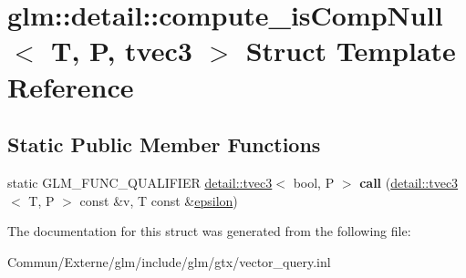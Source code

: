 \hypertarget{structglm_1_1detail_1_1compute__is_comp_null_3_01_t_00_01_p_00_01tvec3_01_4}{}\section{glm\+:\+:detail\+:\+:compute\+\_\+is\+Comp\+Null$<$ T, P, tvec3 $>$ Struct Template Reference}
\label{structglm_1_1detail_1_1compute__is_comp_null_3_01_t_00_01_p_00_01tvec3_01_4}
\subsection*{Static Public Member Functions}
\begin{DoxyCompactItemize}
\item 
static G\+L\+M\+\_\+\+F\+U\+N\+C\+\_\+\+Q\+U\+A\+L\+I\+F\+I\+ER \hyperlink{structglm_1_1detail_1_1tvec3}{detail\+::tvec3}$<$ bool, P $>$ {\bfseries call} (\hyperlink{structglm_1_1detail_1_1tvec3}{detail\+::tvec3}$<$ T, P $>$ const \&v, T const \&\hyperlink{group__gtc__constants_gacb41049b8d22c8aa90e362b96c524feb}{epsilon})\hypertarget{structglm_1_1detail_1_1compute__is_comp_null_3_01_t_00_01_p_00_01tvec3_01_4_a0a45c3ab9debff20dae1f53392500840}{}\label{structglm_1_1detail_1_1compute__is_comp_null_3_01_t_00_01_p_00_01tvec3_01_4_a0a45c3ab9debff20dae1f53392500840}

\end{DoxyCompactItemize}


The documentation for this struct was generated from the following file\+:\begin{DoxyCompactItemize}
\item 
Commun/\+Externe/glm/include/glm/gtx/vector\+\_\+query.\+inl\end{DoxyCompactItemize}
